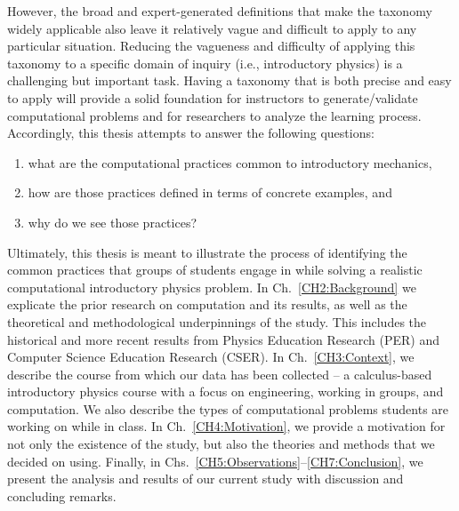 \documentclass{msuphddissertation}
\begin{document}
\begin{doublespace}
However, the broad and expert-generated definitions that make the taxonomy widely applicable also leave it relatively vague and difficult to apply to any particular situation.  Reducing the vagueness and difficulty of applying this taxonomy to a specific domain of inquiry (i.e., introductory physics) is a challenging but important task.  Having a taxonomy that is both precise and easy to apply will provide a solid foundation for instructors to generate/validate computational problems and for researchers to analyze the learning process.  Accordingly, this thesis attempts to answer the following questions: \begin{enumerate}
\item what are the computational practices common to introductory mechanics,
\item how are those practices defined in terms of concrete examples, and
\item why do we see those practices?\end{enumerate}

Ultimately, this thesis is meant to illustrate the process of identifying the common practices that groups of students engage in while solving a realistic computational introductory physics problem.  In Ch.~\ref{CH2:Background} we explicate the prior research on computation and its results, as well as the theoretical and methodological underpinnings of the study.  This includes the historical and more recent results from Physics Education Research (PER) and Computer Science Education Research (CSER).  In Ch.~\ref{CH3:Context}, we describe the course from which our data has been collected -- a calculus-based introductory physics course with a focus on engineering, working in groups, and computation.  We also describe the types of computational problems students are working on while in class.  In Ch.~\ref{CH4:Motivation}, we provide a motivation for not only the existence of the study, but also the theories and methods that we decided on using.  Finally, in Chs.~\ref{CH5:Observations}--\ref{CH7:Conclusion}, we present the analysis and results of our current study with discussion and concluding remarks.



\end{doublespace}
\end{document}

